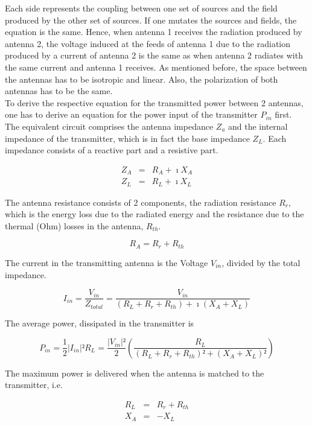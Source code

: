 \documentclass[a4paper,11pt]{report}
\begin{document}
Each side represents the coupling between one set of sources and the field produced by the other set of sources. If one mutates the sources and fields, the equation is the same. Hence, when antenna 1 receives the radiation produced by antenna 2, the voltage induced at the feeds of antenna 1 due to the radiation produced by a current of antenna 2 is the same as when antenna 2 radiates with the same current and antenna 1 receives. As mentioned before, the space between the antennas has to be isotropic and linear. Also, the polarization of both antennas has to be the same.\\


To derive the respective equation for the transmitted power between 2 antennas, one has to derive an equation for the power input of the transmitter $P_{in}$ first. The equivalent circuit comprises the antenna impedance $Z_a$ and the internal impedance of the transmitter, which is in fact the base impedance $Z_L$. Each impedance consists of a reactive part and a resistive part.

\begin{eqnarray}
 Z_A&=&R_A+\imath X_A\\
Z_L&=&R_L+\imath X_L
\end{eqnarray}

The antenna resistance consists of 2 components, the radiation resistance $R_r$, which is the energy loss due to the radiated energy and the resistance due to the thermal (Ohm) losses in the antenna, $R_{th}$.

\begin{equation}
 R_A=R_r+R_{th}
\end{equation}


The current in the transmitting antenna is the Voltage $V_{in}$, divided by the total impedance.

\begin{equation}
 I_{in}=\frac{V_{in}}{Z_{total}}=\frac{V_{in}}{(R_L+R_r+R_{th})+\imath(X_A+X_L)}
\end{equation}

The average power, dissipated in the transmitter is

\begin{equation}
 P_{in}=\frac{1}{2}|I_{in}|²R_L= \frac{|V_{in}|²}{2}      \left(\frac{R_L}{(R_L+R_r+R_{th})²+(X_A+X_L)²}\right)
\end{equation}

The maximum power is delivered when the antenna is matched to the transmitter, i.e.

\begin{eqnarray}
 R_L&=& R_r+R_{th}\\
X_A&=&- X_L
\end{eqnarray}
\end{document}
